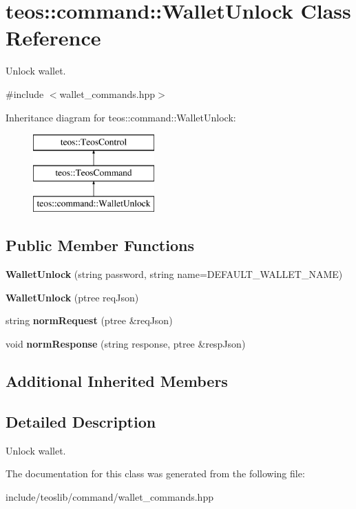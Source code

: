 \hypertarget{classteos_1_1command_1_1_wallet_unlock}{}\section{teos\+:\+:command\+:\+:Wallet\+Unlock Class Reference}
\label{classteos_1_1command_1_1_wallet_unlock}


Unlock wallet.  




{\ttfamily \#include $<$wallet\+\_\+commands.\+hpp$>$}

Inheritance diagram for teos\+:\+:command\+:\+:Wallet\+Unlock\+:\begin{figure}[H]
\begin{center}
\leavevmode
\includegraphics[height=3.000000cm]{classteos_1_1command_1_1_wallet_unlock}
\end{center}
\end{figure}
\subsection*{Public Member Functions}
\begin{DoxyCompactItemize}
\item 
\mbox{\label{classteos_1_1command_1_1_wallet_unlock_a87eecaca05f1c7c96dda5de7c1b35c0e}} 
{\bfseries Wallet\+Unlock} (string password, string name=D\+E\+F\+A\+U\+L\+T\+\_\+\+W\+A\+L\+L\+E\+T\+\_\+\+N\+A\+ME)
\item 
\mbox{\label{classteos_1_1command_1_1_wallet_unlock_a8f5f39f30a96a1c176f2fb5249bdfa0b}} 
{\bfseries Wallet\+Unlock} (ptree req\+Json)
\item 
\mbox{\label{classteos_1_1command_1_1_wallet_unlock_a186153f624725bddb198992c7ffde702}} 
string {\bfseries norm\+Request} (ptree \&req\+Json)
\item 
\mbox{\label{classteos_1_1command_1_1_wallet_unlock_ad8eb4d249f3305fa9beb3b69280e889d}} 
void {\bfseries norm\+Response} (string response, ptree \&resp\+Json)
\end{DoxyCompactItemize}
\subsection*{Additional Inherited Members}


\subsection{Detailed Description}
Unlock wallet. 

The documentation for this class was generated from the following file\+:\begin{DoxyCompactItemize}
\item 
include/teoslib/command/wallet\+\_\+commands.\+hpp\end{DoxyCompactItemize}
